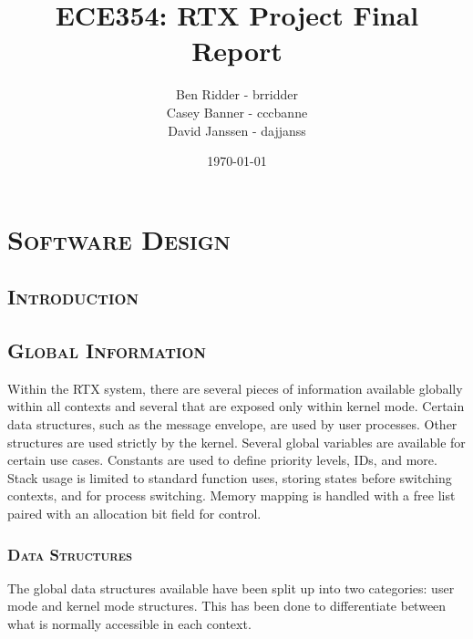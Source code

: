 \documentclass[oneside]{report}
\begin{document}
\lstset{language=C, 
        frame=single, 
        breaklines=true,
        basicstyle=\small\ttfamily,
        columns=fullflexible}


\title{ECE354: RTX Project Final Report}
\author{Ben Ridder - brridder \\
Casey Banner - cccbanne \\
David Janssen - dajjanss }
\date{\today}

\maketitle

\tableofcontents

\chapter{\textsc{Software Design}}

\section{\textsc{Introduction}}

\section{\textsc{Global Information}}


Within the RTX system, there are several pieces of information available
globally within all contexts and several that are exposed only within kernel
mode. Certain data structures, such as the message envelope, are used by
user processes. Other structures are used strictly by the kernel. Several
global variables are available for certain use cases. Constants are used to
define priority levels, IDs, and more. Stack usage is limited to standard
function uses, storing states before switching contexts, and for process
switching. Memory mapping is handled with a free list paired with an allocation
bit field for control.

\subsection{\textsc{Data Structures}}
The global data structures available have been split up into two categories:
user mode and kernel mode structures. This has been done to differentiate
between what is normally accessible in each context.
\end{document}
